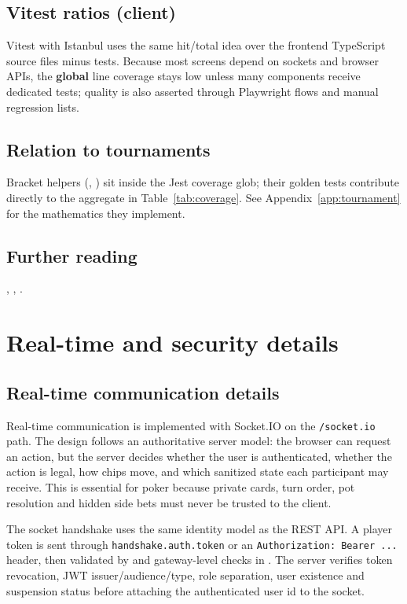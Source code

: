 \documentclass[11pt,a4paper]{article}
\begin{document}
\subsection{Vitest ratios (client)}

Vitest with Istanbul uses the same hit/total idea over the frontend TypeScript source files minus tests. Because most screens depend on sockets and browser APIs, the \textbf{global} line coverage stays low unless many components receive dedicated tests; quality is also asserted through Playwright flows and manual regression lists.

\subsection{Relation to tournaments}

Bracket helpers (, ) sit inside the Jest coverage glob; their golden tests contribute directly to the aggregate in Table~\ref{tab:coverage}. See Appendix~\ref{app:tournament} for the mathematics they implement.

\subsection{Further reading}

, , .

\section{Real-time and security details}
\label{app:rt-security-solutions}

\subsection{Real-time communication details}

Real-time communication is implemented with Socket.IO on the \texttt{/socket.io} path. The design follows an authoritative server model: the browser can request an action, but the server decides whether the user is authenticated, whether the action is legal, how chips move, and which sanitized state each participant may receive. This is essential for poker because private cards, turn order, pot resolution and hidden side bets must never be trusted to the client.

The socket handshake uses the same identity model as the REST API. A player token is sent through \texttt{handshake.auth.token} or an \texttt{Authorization: Bearer ...} header, then validated by  and gateway-level checks in . The server verifies token revocation, JWT issuer/audience/type, role separation, user existence and suspension status before attaching the authenticated user id to the socket.
\end{document}
